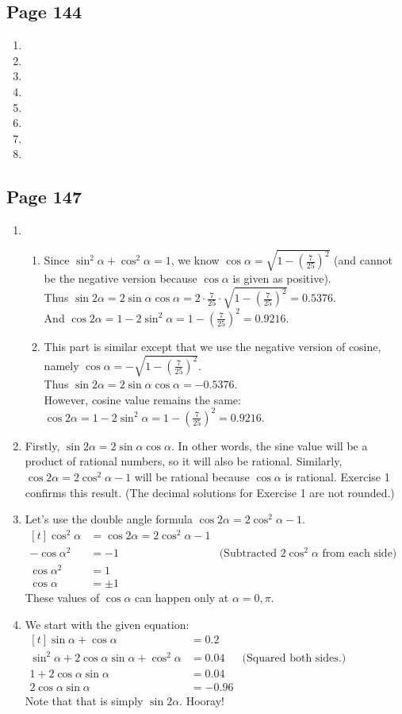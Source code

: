 \documentclass{article}
\newenvironment{solutions}[1]
{\subsection*{#1}
 \begin{enumerate}[leftmargin=1.5em]}
{\end{enumerate}}
\newcommand{\solution}{\item}
\newenvironment{subsolutions}
{\begin{enumerate}}
{\end{enumerate}}
\begin{document}
\begin{solutions}{Page 144}
\solution
\solution
\solution
\solution
\solution
\solution
\solution
\solution
\end{solutions}

\begin{solutions}{Page 147}
\solution 
    \begin{subsolutions}
        \solution Since $\sin^2 \alpha + \cos^2\alpha = 1$, we know $\cos\alpha = \sqrt{1-(\frac{7}{25})^2}$ (and cannot be the negative version because $\cos \alpha$ is given as positive).\\
        Thus $\sin 2\alpha = 2\sin\alpha \cos \alpha = 2\cdot \frac{7}{25}\cdot\sqrt{1-(\frac{7}{25})^2}=0.5376$.\\
        And $\cos2\alpha =1-2\sin^2\alpha = 1-(\frac{7}{25})^2=0.9216$.
        \solution This part is similar except that we use the negative version of cosine, namely $\cos\alpha=-\sqrt{1-(\frac{7}{25})^2}$.\\
        Thus $\sin 2\alpha = 2\sin\alpha \cos \alpha = -0.5376$.\\
        However, cosine value remains the same: $\cos2\alpha =1-2\sin^2\alpha = 1-(\frac{7}{25})^2=0.9216$.
    \end{subsolutions}

\solution Firstly, $\sin 2\alpha=2\sin\alpha\cos\alpha$. In other words, the sine value will be a product of rational numbers, so it will also be rational. Similarly, $\cos 2\alpha=2\cos ^2 \alpha - 1$ will be rational because $\cos\alpha$ is rational. Exercise 1 confirms this result. (The decimal solutions for Exercise 1 are not rounded.)

\solution Let's use the double angle formula $\cos 2\alpha=2\cos^2\alpha -1$.\\
$\begin{aligned}[t]
    \cos^2\alpha &= \cos2\alpha=2\cos^2\alpha -1\\
    -\cos\alpha^2&=-1 &\text{(Subtracted $2\cos^2\alpha$ from each side)}\\
    \cos\alpha^2&=1\\
    \cos\alpha&=\pm 1
\end{aligned}$\\
These values of $\cos\alpha$ can happen only at $\alpha = 0, \pi$.

\solution We start with the given equation:\\
$\begin{aligned}[t]
    \sin\alpha+\cos\alpha &= 0.2\\
    \sin^2\alpha+2\cos\alpha\sin\alpha+\cos^2\alpha&=0.04 &\text{(Squared both sides.)}\\
    1+2\cos\alpha\sin\alpha&=0.04\\
    2\cos\alpha\sin\alpha &=-0.96
\end{aligned}$\\
Note that that is simply $\sin 2\alpha$. Hooray!


\end{solutions}
\end{document}
